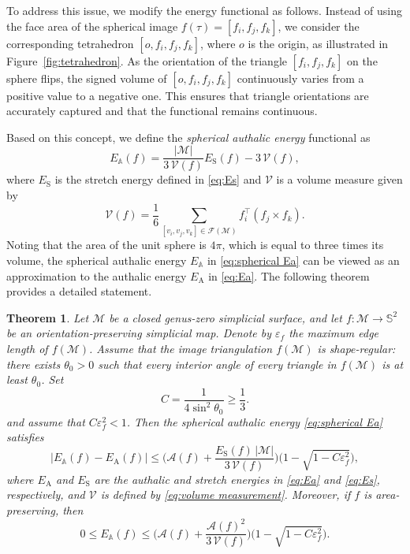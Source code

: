 \documentclass{article}
\numberwithin{equation}{section}
\newtheorem{theorem}{Theorem}
\def\rS{\mathrm{S}}
\def\rA{\mathrm{A}}
\def\A{\mathcal{A}}
\def\bbA{\mathbb{A}}
\def\M{\mathcal{M}}
\def\bV{\mathscr{V}}
\begin{document}
To address this issue, we modify the energy functional as follows. Instead of using the face area of the spherical image $f(\tau) = [f_i, f_j, f_k]$, we consider the corresponding tetrahedron $[o, f_i, f_j, f_k]$, where $o$ is the origin, as illustrated in Figure~\ref{fig:tetrahedron}. As the orientation of the triangle $[f_i, f_j, f_k]$ on the sphere flips, the signed volume of $[o, f_i, f_j, f_k]$ continuously varies from a positive value to a negative one. This ensures that triangle orientations are accurately captured and that the functional remains continuous. 

Based on this concept, we define the {\em spherical authalic energy} functional as
\begin{equation} 
E_\bbA(f) = \frac{|\M|}{3\, \bV(f)} E_\rS(f) - 3\,\bV(f),
\label{eq:spherical Ea}
\end{equation}
where $E_\rS$ is the stretch energy defined in \eqref{eq:Es} and $\bV$ is a volume measure given by
\begin{equation} 
\bV(f) = \frac{1}{6} \sum_{[v_i, v_j, v_k] \in \mathcal{F(M)}} f_i^\top (f_j \times f_k).
\label{eq:volume measurement}
\end{equation}
Noting that the area of the unit sphere is $4\pi$, which is equal to three times its volume, the spherical authalic energy $E_\bbA$ in \eqref{eq:spherical Ea} can be viewed as an approximation to the authalic energy $E_\rA$ in \eqref{eq:Ea}. The following theorem provides a detailed statement.

\begin{theorem} \label{thm:sphere_Ea}
Let $\M$ be a closed genus-zero simplicial surface, and let $f:\M\to\mathbb{S}^{2}$ be an orientation-preserving simplicial map. Denote by $\varepsilon_f$ the maximum edge length of $f(\M)$. Assume that the image triangulation $f(\M)$ is shape-regular: there exists $\theta_0>0$ such that every interior angle of every triangle in $f(\M)$ is at least $\theta_0$. Set
\[
C=\frac{1}{4\sin^2\theta_0} \geq \frac{1}{3}.
\]
and assume that $C\varepsilon_f^2<1$. Then the spherical authalic energy \eqref{eq:spherical Ea} satisfies
\begin{equation}
\big|E_\bbA(f)-E_\rA(f)\big|
\leq \bigg(\A(f)+\frac{E_\rS(f)\,|\M|}{3\,\bV(f)}\bigg)
\Big(1-\sqrt{1-C\varepsilon_f^2}\Big),
\label{eq:4.3}
\end{equation}
where $E_\rA$ and $E_\rS$ are the authalic and stretch energies in \eqref{eq:Ea} and \eqref{eq:Es}, respectively, and $\bV$ is defined by \eqref{eq:volume measurement}. Moreover, if $f$ is area-preserving, then
\begin{equation}
0\leq E_\bbA(f)
\leq \bigg(\A(f)+\frac{\A(f)^2}{3\,\bV(f)}\bigg)
\Big(1-\sqrt{1-C\varepsilon_f^2}\Big).
\label{eq:4.4}
\end{equation}
\end{theorem}
\end{document}
